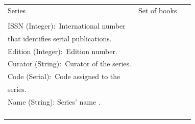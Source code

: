\begin{longtable}{l|l|l}
\hline
Series   & \textcolor[rgb]{0.125,0.129,0.141}{Set of books~}                                                                                                          & \begin{tabular}[c]{@{}l@{}}\\\\ISSN (Integer):~\textcolor[rgb]{0.125,0.129,0.141}{International number}\\\textcolor[rgb]{0.125,0.129,0.141}{that identifies serial publications.}\\Edition (Integer):~\textcolor[rgb]{0.125,0.129,0.141}{Edition number.}\\Curator (String):~\textcolor[rgb]{0.125,0.129,0.141}{Curator of the series}.\\Code (Serial):~\textcolor[rgb]{0.125,0.129,0.141}{Code assigned to the }\\\textcolor[rgb]{0.125,0.129,0.141}{series.}\\Name (String): Series' name .\\\\\\\\\end{tabular}                                                                                                                                                                                                                                                                                                                                                                                                                                                                                                                                                                                                                                                                                                                                                                                                             \\ 
\hline

\end{longtable}
